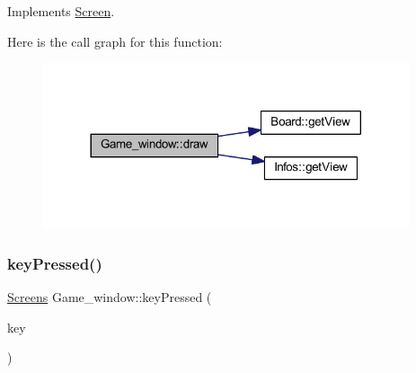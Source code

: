 Implements \hyperlink{class_screen_abcb5544dfe717c7da181520803f43e25}{Screen}.

Here is the call graph for this function\+:\nopagebreak
\begin{figure}[H]
\begin{center}
\leavevmode
\includegraphics[width=305pt]{class_game__window_aafdea9d00265261abfac6ad233b54638_cgraph}
\end{center}
\end{figure}
\mbox{\label{class_game__window_a72304de2044c29f1373037bd818f674f}} 
\subsubsection{\texorpdfstring{key\+Pressed()}{keyPressed()}}
{\footnotesize\ttfamily \hyperlink{_globals_8h_a3d5776bab98402b03be09156bacf4f68}{Screens} Game\+\_\+window\+::key\+Pressed (\begin{DoxyParamCaption}\item[{const sf\+::\+Event\+::\+Key\+Event \&}]{key }\end{DoxyParamCaption})}

